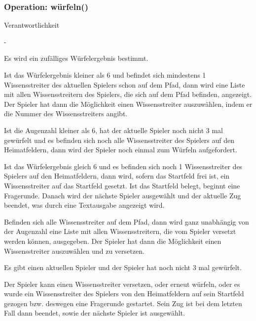 \subsubsection{Operation: würfeln()}
\begin{labeling}[:]{Verantwortlichkeit}
\item [Parameter] -
\item [Verantwortlichkeit] Es wird ein zufälliges Würfelergebnis bestimmt.

Ist das Würfelergebnis kleiner als 6 und befindet sich mindestens 1 Wissensstreiter des aktuellen Spielers schon auf dem Pfad, dann wird eine Liste mit allen Wissensstreitern des Spielers, die sich auf dem Pfad befinden, angezeigt. Der Spieler hat dann die Möglichkeit einen Wissensstreiter auszuwählen, indem er die Nummer des Wissensstreiters angibt.

Ist die Augenzahl kleiner als 6, hat der aktuelle Spieler noch nicht 3 mal gewürfelt und es befinden sich noch alle Wissensstreiter des Spielers auf den Heimatfeldern, dann wird der Spieler noch einmal zum Würfeln aufgefordert.

Ist das Würfelergebnis gleich 6 und es befinden sich noch 1 Wissensstreiter des Spielers auf den Heimatfeldern, dann wird, sofern das Startfeld frei ist, ein Wissensstreiter auf das Startfeld gesetzt. Ist das Startfeld belegt, beginnt eine Fragerunde. Danach wird der nächste Spieler ausgewählt und der aktuelle Zug beendet, was durch eine Textausgabe angezeigt wird.

Befinden sich alle Wissensstreiter auf dem Pfad, dann wird ganz unabhängig von der Augenzahl eine Liste mit allen Wissensstreitern, die vom Spieler versetzt werden können, ausgegeben.
Der Spieler hat dann die Möglichkeit einen Wissensstreiter auszuwählen und zu versetzen.
\item [Ausnahmen]
\item [Vorbedingungen] Es gibt einen aktuellen Spieler und der Spieler hat noch nicht 3 mal gewürfelt.
\item [Nachbedingungen] Der Spieler kann einen Wissensstreiter versetzen, oder erneut würfeln, oder es wurde ein Wissensstreiter des Spielers von den Heimatfeldern auf sein Startfeld gezogen bzw. deswegen eine Fragerunde gestartet. Sein Zug ist bei dem letzten Fall dann beendet, sowie der nächste Spieler ist ausgewählt.
\end{labeling}

